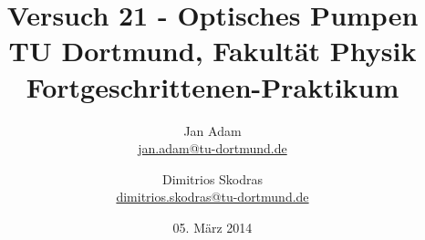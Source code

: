 



\title{Versuch 21 - Optisches Pumpen\\				%
\large TU Dortmund, Fakultät Physik\\ 
\normalsize Fortgeschrittenen-Praktikum}

\author{Jan Adam\\			%
{\small \href{jan.adam@tu-dortmund.de}{jan.adam@tu-dortmund.de}}	%
\and						%
Dimitrios Skodras\\					%
{\small \href{dimitrios.skodras@tu-dortmund.de}{dimitrios.skodras@tu-dortmund.de}}		%
}
\date{05. März 2014}				%





\maketitle					%
\thispagestyle{empty} 				%



\tableofcontents


\newpage					%


